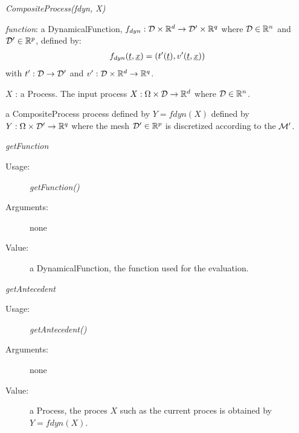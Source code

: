 \begin{description}

\item[Usage:]  \textit{CompositeProcess(fdyn, X)}
\bigskip

\item[Arguments:]  \rule{0pt}{1em}
\begin{description}
\item \textit{function}: a DynamicalFunction,  $f_{dyn}:{\mathcal D} \times {\mathbb R}^d \rightarrow {\mathcal D}' \times {\mathbb R}^q$ where ${\mathcal D} \in {\mathbb R}^n$ and  ${\mathcal D}' \in {\mathbb R}^p$, defined by:
\begin{align}\label{dynFct}
f_{dyn}({\underline{t}}, {\underline{x}}) = (t'({\underline{t}}), v'({\underline{t}}, {\underline{x}}))
\end{align}
with $t': {\mathcal D} \rightarrow {\mathcal D}'$ and $v': {\mathcal D} \times {\mathbb R}^d \rightarrow {\mathbb R}^q$.
\item $X$ : a Process. The input process $X: \Omega \times {\mathcal D} \rightarrow {\mathbb R}^d$ where ${\mathcal D} \in {\mathbb R}^n$.
\end{description}
\bigskip

\item[Value:] a CompositeProcess process defined by $Y = fdyn(X)$ defined by $Y: \Omega \times {\mathcal D}' \rightarrow {\mathbb R}^q$ where the mesh ${\mathcal D}' \in {\mathbb R}^p$  is discretized according to the ${\mathcal M}'$.

\item[Some methods :]  \rule{0pt}{1em}

\begin{description}

\item \textit{getFunction}
\begin{description}
\item[Usage:] \textit{getFunction()}
\item[Arguments:] none
\item[Value:] a DynamicalFunction, the function used for the evaluation.
\end{description}
\bigskip

\item \textit{getAntecedent}
\begin{description}
\item[Usage:] \textit{getAntecedent()}
\item[Arguments:] none
\item[Value:] a Process, the proces $X$ such as the current proces is obtained by $Y= fdyn(X)$.
\end{description}


\end{description}
\end{description}
